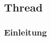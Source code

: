 \vspace*{4cm}
\begin{center}
\part{Thread}
\end{center}
\vspace*{\fill}
\clearpage

\section{Einleitung}\label{sec:EinleitungThread}







